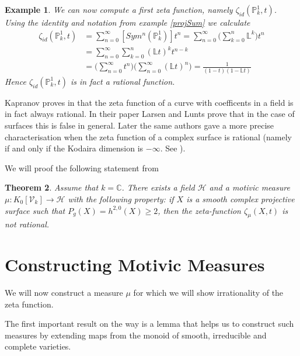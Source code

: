 \documentclass[11pt, a4paper, german]{article}
\theoremstyle{plain}
\newtheorem{theorem}{Theorem}
\newtheorem{example}[theorem]{Example}
\theoremstyle{definition}
\newcommand{\gring}[1][k]{K_0[\mathcal{V}_#1]}
\begin{document}
\begin{example}
    We can now compute a first zeta function, namely $\zeta_{id}(\mathbb{P}_k^1, t)$. Using the identity and notation from example \ref{projSum}
    we calculate
    \begin{align*}
        \zeta_{id}(\mathbb{P}_k^1, t) & = \sum_{n=0}^\infty [Sym^n({\mathbb{P}_k^1})]t^n 
                                       = \sum_{n=0}^\infty \big(\sum_{k=0}^n \mathbb{L}^k\big) t^n \\
                                       & = \sum_{n=0}^\infty \sum_{k=0}^n (\mathbb{L}t)^k t^{n-k} \\
                                      & = \Big( \sum_{n=0}^\infty t^n \Big) \Big( \sum_{n=0}^\infty (\mathbb{L}t)^n \Big) 
                                        = \frac{1}{(1-t)(1-\mathbb{L}t)} %
    \end{align*}
    Hence $\zeta_{id}(\mathbb{P}_k^1, t)$ is in fact a rational function.
\end{example}

Kapranov proves in \cite{kapranov} that the zeta function of a curve with coefficents in a field is in fact always rational. 
In their paper \cite{MR1996804} Larsen and Lunts prove that in the case of surfaces this is false in general.
Later the same authors gave a more precise characterisation when the zeta function of a complex surface is rational 
(namely if and only if the Kodaira dimension is $-\infty$. See \cite{LL2}).

We will proof the following statement from \cite{MR1996804}
\begin{theorem}
    \label{irrational}
    Assume that $k = \mathbb{C}$. There exists a field $\mathcal{H}$ and a motivic measure $\mu \colon \gring \to \mathcal{H}$ with the following
    property: if $X$ is a smooth complex projective surface such that $P_g(X)=h^{2,0}(X) \ge 2$, then the zeta-function $\zeta_{\mu}(X,t)$
    is not rational.
\end{theorem}

\section{Constructing Motivic Measures}

We will now construct a measure $\mu$ for which we will show irrationality of the zeta function.

The first important result on the way is a lemma that helps us to construct such measures by extending maps from the monoid of smooth, irreducible
and complete varieties.
\end{document}
